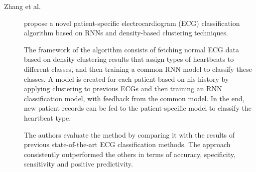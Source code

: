 \begin{description}
    \item[Zhang et al.]\cite{Zhang.Wang.ea_PatientspecificECGclassification_2017} propose a novel patient-specific electrocardiogram (ECG) classification algorithm based on RNNs and density-based clustering techniques. 
    
    The framework of the algorithm consists of fetching normal ECG data based on density clustering results that assign types of heartbeats to different classes, and then training a common RNN model to classify these classes. A model is created for each patient based on his history by applying clustering to previous ECGs and then training an RNN classification model, with feedback from the common model. In the end, new patient records can be fed to the patient-specific model to classify the heartbeat type.

    The authors evaluate the method by comparing it with the results of previous state-of-the-art ECG classification methods. The approach consistently outperformed the others in terms of accuracy, specificity, sensitivity and positive predictivity.
\end{description}

    

